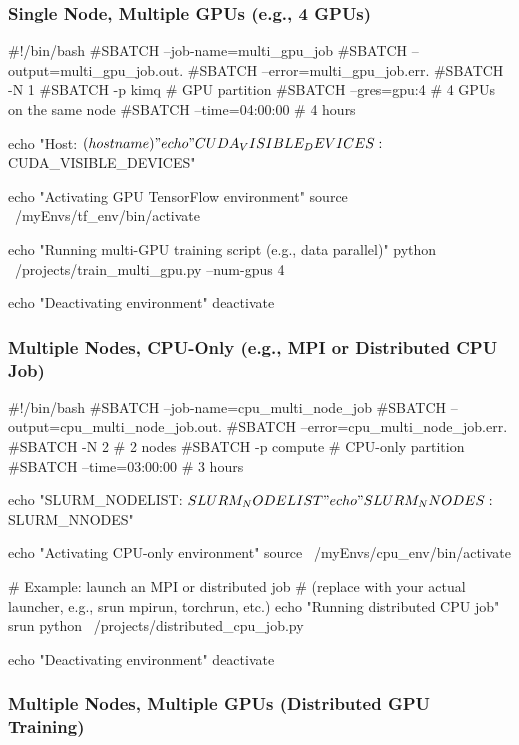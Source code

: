 \documentclass[11pt]{article}
\begin{document}
\subsubsection{Single Node, Multiple GPUs (e.g., 4 GPUs)}
\label{subsubsec:multi-gpu-single-node}

\begin{codeblock}
#!/bin/bash
#SBATCH --job-name=multi_gpu_job
#SBATCH --output=multi_gpu_job.out.%
#SBATCH --error=multi_gpu_job.err.%
#SBATCH -N 1
#SBATCH -p kimq            # GPU partition
#SBATCH --gres=gpu:4       # 4 GPUs on the same node
#SBATCH --time=04:00:00    # 4 hours

echo "Host: $(hostname)"
echo "CUDA_VISIBLE_DEVICES: $CUDA_VISIBLE_DEVICES"

echo "Activating GPU TensorFlow environment"
source ~/myEnvs/tf_env/bin/activate

echo "Running multi-GPU training script (e.g., data parallel)"
python ~/projects/train_multi_gpu.py --num-gpus 4

echo "Deactivating environment"
deactivate
\end{codeblock}

\subsubsection{Multiple Nodes, CPU-Only (e.g., MPI or Distributed CPU Job)}
\label{subsubsec:multi-node-cpu}

\begin{codeblock}
#!/bin/bash
#SBATCH --job-name=cpu_multi_node_job
#SBATCH --output=cpu_multi_node_job.out.%
#SBATCH --error=cpu_multi_node_job.err.%
#SBATCH -N 2               # 2 nodes
#SBATCH -p compute         # CPU-only partition
#SBATCH --time=03:00:00    # 3 hours

echo "SLURM_NODELIST: $SLURM_NODELIST"
echo "SLURM_NNODES:   $SLURM_NNODES"

echo "Activating CPU-only environment"
source ~/myEnvs/cpu_env/bin/activate

# Example: launch an MPI or distributed job
# (replace with your actual launcher, e.g., srun mpirun, torchrun, etc.)
echo "Running distributed CPU job"
srun python ~/projects/distributed_cpu_job.py

echo "Deactivating environment"
deactivate
\end{codeblock}

\subsubsection{Multiple Nodes, Multiple GPUs (Distributed GPU Training)}
\label{subsubsec:multi-node-multi-gpu}
\end{document}
